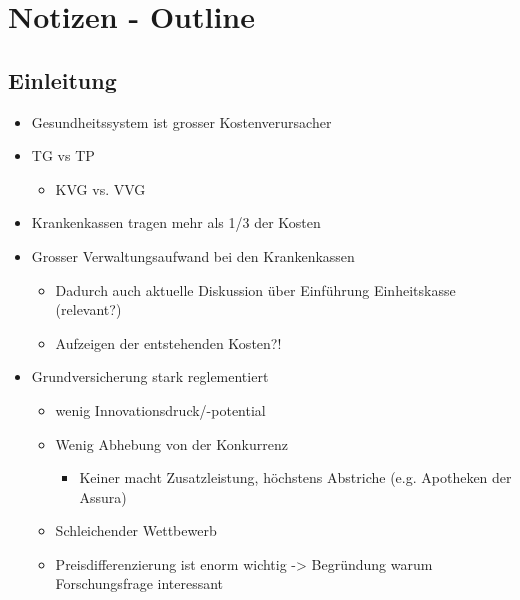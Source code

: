 \documentclass[12pt, twoside]{extarticle}
\begin{document}


\section{Notizen - Outline}

\subsection{Einleitung}
\begin{itemize}
    \item Gesundheitssystem ist grosser Kostenverursacher
    \item TG vs TP
    \begin{itemize}
         \item KVG vs. VVG
    \end{itemize}
	 \item Krankenkassen tragen mehr als 1/3 der Kosten
	 \item Grosser Verwaltungsaufwand bei den Krankenkassen
     \begin{itemize}
        \item Dadurch auch aktuelle Diskussion über Einführung Einheitskasse (relevant?)
        \item Aufzeigen der entstehenden Kosten?!
    \end{itemize}
	\item Grundversicherung stark reglementiert
    \begin{itemize}
        \item wenig Innovationsdruck/-potential
        \item Wenig Abhebung von der Konkurrenz
        \begin{itemize}
			\item Keiner macht Zusatzleistung, höchstens Abstriche (e.g. Apotheken der Assura)
        \end{itemize}
        \item Schleichender Wettbewerb
        \item Preisdifferenzierung ist enorm wichtig -> Begründung warum Forschungsfrage interessant
    \end{itemize}

\end{itemize}
\end{document}
